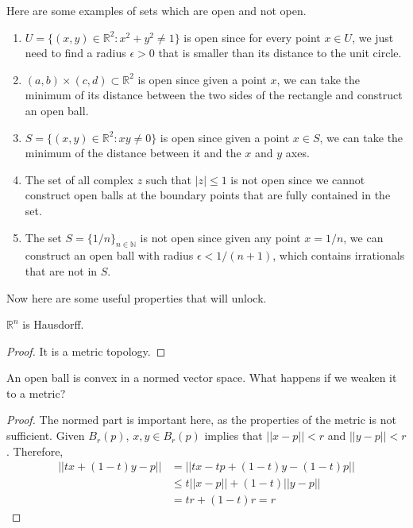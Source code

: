  \begin{example}
    Here are some examples of sets which are open and not open. 
    \begin{enumerate}
      \item $U=\{(x,y)\in \mathbb{R}^2 : x^2+y^2 \neq 1\}$ is open since for every point $x \in U$, we just need to find a radius $\epsilon >0$ that is smaller than its distance to the unit circle. 
      \item $(a, b) \times (c, d) \subset \mathbb{R}^2$ is open since given a point $x$, we can take the minimum of its distance between the two sides of the rectangle and construct an open ball. 
      \item $S=\{(x,y)\in \mathbb{R}^2:xy\neq 0\}$ is open since given a point $x \in S$, we can take the minimum of the distance between it and the $x$ and $y$ axes. 
      \item The set of all complex $z$ such that $|z| \leq 1$ is not open since we cannot construct open balls at the boundary points that are fully contained in the set. 
      \item The set $S = \{1/n\}_{n \in \mathbb{N}}$ is not open since given any point $x = 1/n$, we can construct an open ball with radius $\epsilon < 1/(n+1)$, which contains irrationals that are not in $S$. 
    \end{enumerate}
  \end{example}

  Now here are some useful properties that will unlock. 

  \begin{theorem}[Hausdorff]
    $\mathbb{R}^n$ is Hausdorff. 
  \end{theorem}
  \begin{proof}
    It is a metric topology. 
  \end{proof}

  \begin{theorem}[Convexity]
    An open ball is convex in a normed vector space. What happens if we weaken it to a metric? 
  \end{theorem}
  \begin{proof}
    The normed part is important here, as the properties of the metric is not sufficient. Given $B_r (p)$, $x, y \in B_r (p)$ implies that $||x - p|| < r$ and $||y - p ||<r$. Therefore, 
    \begin{align}
      ||t x + (1 - t)y - p|| & = ||t x - tp + (1 - t) y - (1 - t) p|| \\
      & \leq t ||x - p|| + (1 - t) ||y - p|| \\
      & = t r + (1 - t) r = r 
    \end{align}
  \end{proof}

